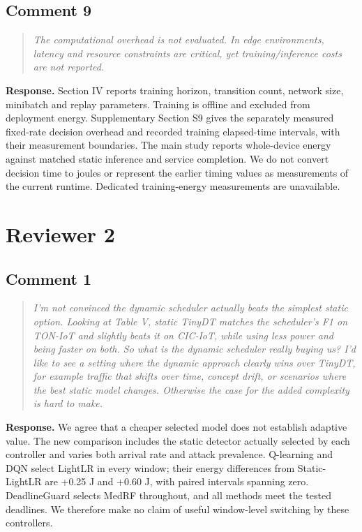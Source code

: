 \documentclass[11pt,a4paper]{article}
\newenvironment{comment}{\begin{quote}\small\itshape}{\end{quote}}
\newcommand{\response}{\noindent\textbf{Response.} }
\begin{document}
\subsection*{Comment 9}
\begin{comment}
The computational overhead is not evaluated. In edge environments, latency and resource constraints are critical, yet training/inference costs are not reported.
\end{comment}
\response Section IV reports training horizon, transition count, network size, minibatch and replay parameters. Training is offline and excluded from deployment energy. Supplementary Section S9 gives the separately measured fixed-rate decision overhead and recorded training elapsed-time intervals, with their measurement boundaries. The main study reports whole-device energy against matched static inference and service completion. We do not convert decision time to joules or represent the earlier timing values as measurements of the current runtime. Dedicated training-energy measurements are unavailable.

\section*{Reviewer 2}
\subsection*{Comment 1}
\begin{comment}
I'm not convinced the dynamic scheduler actually beats the simplest static option. Looking at Table V, static TinyDT matches the scheduler's F1 on TON-IoT and slightly beats it on CIC-IoT, while using less power and being faster on both. So what is the dynamic scheduler really buying us? I'd like to see a setting where the dynamic approach clearly wins over TinyDT, for example traffic that shifts over time, concept drift, or scenarios where the best static model changes. Otherwise the case for the added complexity is hard to make.
\end{comment}
\response We agree that a cheaper selected model does not establish adaptive value. The new comparison includes the static detector actually selected by each controller and varies both arrival rate and attack prevalence. Q-learning and DQN select LightLR in every window; their energy differences from Static-LightLR are +0.25 J and +0.60 J, with paired intervals spanning zero. DeadlineGuard selects MedRF throughout, and all methods meet the tested deadlines. We therefore make no claim of useful window-level switching by these controllers.
\end{document}
